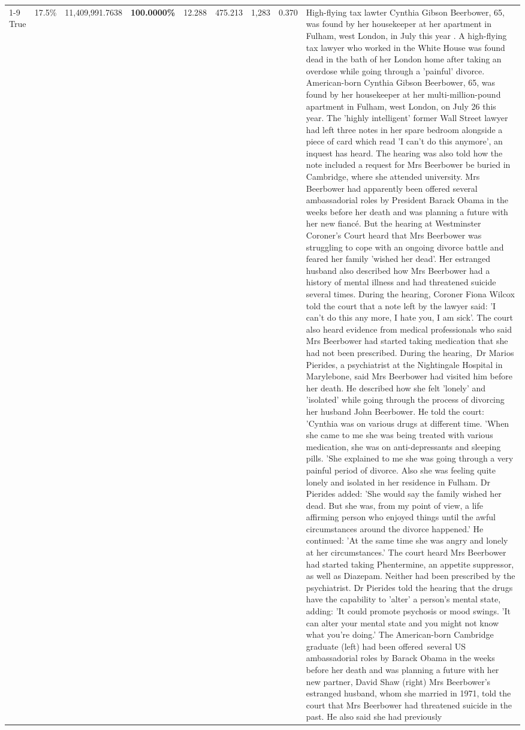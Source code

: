 \begin{table}[H]
\begin{tabular}{lllrlllll}
\cline{1-9}
True & 17.5\% & 11,409,991.7638 & \bfseries \color{red} 100.0000\% & 12.288 & 475.213 & 1,283 & 0.370 & High-flying tax lawter Cynthia Gibson Beerbower, 65, was found by her housekeeper at her apartment in Fulham, west London, in July this year . A high-flying tax lawyer who worked in the White House was found dead in the bath of her London home after taking an overdose while going through a 'painful' divorce. American-born Cynthia Gibson Beerbower, 65, was found by her housekeeper at her multi-million-pound apartment in Fulham, west London, on July 26 this year. The 'highly intelligent' former Wall Street lawyer had left three notes in her spare bedroom alongside a piece of card which read 'I can't do this anymore', an inquest has heard. The hearing was also told how the note included a request for Mrs Beerbower be buried in Cambridge, where she attended university. Mrs Beerbower had apparently been offered several ambassadorial roles by President Barack Obama in the weeks before her death and was planning a future with her new fiancé. But the hearing at Westminster Coroner's Court heard that Mrs Beerbower was struggling to cope with an ongoing divorce battle and feared her family 'wished her dead'. Her estranged husband also described how Mrs Beerbower had a history of mental illness and had threatened suicide several times. During the hearing, Coroner Fiona Wilcox told the court that a note left by the lawyer said: 'I can't do this any more, I hate you, I am sick'. The court also heard evidence from medical professionals who said Mrs Beerbower had started taking medication that she had not been prescribed. During the hearing, Dr Marios Pierides, a psychiatrist at the Nightingale Hospital in Marylebone, said Mrs Beerbower had visited him before her death. He described how she felt 'lonely' and 'isolated' while going through the process of divorcing her husband John Beerbower. He told the court: 'Cynthia was on various drugs at different time. 'When she came to me she was being treated with various medication, she was on anti-depressants and sleeping pills. 'She explained to me she was going through a very painful period of divorce. Also she was feeling quite lonely and isolated in her residence in Fulham. Dr Pierides added: 'She would say the family wished her dead. But she was, from my point of view, a life affirming person who enjoyed things until the awful circumstances around the divorce happened.' He continued: 'At the same time she was angry and lonely at her circumstances.' The court heard Mrs Beerbower had started taking Phentermine, an appetite suppressor, as well as Diazepam. Neither had been prescribed by the psychiatrist. Dr Pierides told the hearing that the drugs have the capability to 'alter' a person's mental state, adding: 'It could promote psychosis or mood swings. 'It can alter your mental state and you might not know what you're doing.' The American-born Cambridge graduate (left) had been offered several US ambassadorial roles by Barack Obama in the weeks before her death and was planning a future with her new partner, David Shaw (right) Mrs Beerbower's estranged husband, whom she married in 1971, told the court that Mrs Beerbower had threatened suicide in the past. He also said she had previously 
\end{tabular}
\end{table}
